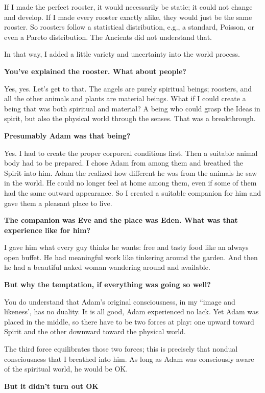 If I made the perfect rooster, it would necessarily be static; it could not change and develop. If I made every rooster exactly alike, they would just be the same rooster. So roosters follow a statistical distribution, e.g., a standard, Poisson, or even a Pareto distribution. The Ancients did not understand that.

In that way, I added a little variety and uncertainty into the world process.

\textbf{You've explained the rooster. What about people?}


Yes, yes. Let's get to that. The angels are purely spiritual beings; roosters, and all the other animals and plants are material beings. What if I could create a being that was both spiritual and material? A being who could grasp the Ideas in spirit, but also the physical world through the senses. That was a breakthrough.

\textbf{Presumably Adam was that being?}


Yes. I had to create the proper corporeal conditions first. Then a suitable animal body had to be prepared. I chose Adam from among them and breathed the Spirit into him. Adam the realized how different he was from the animals he saw in the world. He could no longer feel at home among them, even if some of them had the same outward appearance. So I created a suitable companion for him and gave them a pleasant place to live.

\textbf{The companion was Eve and the place was Eden. What was that experience like for him?}

I gave him what every guy thinks he wants: free and tasty food like an always open buffet. He had meaningful work like tinkering around the garden. And then he had a beautiful naked woman wandering around and available.

\textbf{But why the temptation, if everything was going so well?}


You do understand that Adam's original consciousness, in my ``image and likeness', has no duality. It is all good, Adam experienced no lack. Yet Adam was placed in the middle, so there have to be two forces at play: one upward toward Spirit and the other downward toward the physical world.

The third force equilibrates those two forces; this is precisely that nondual consciousness that I breathed into him. As long as Adam was consciously aware of the spiritual world, he would be OK.

\textbf{But it didn't turn out OK}


